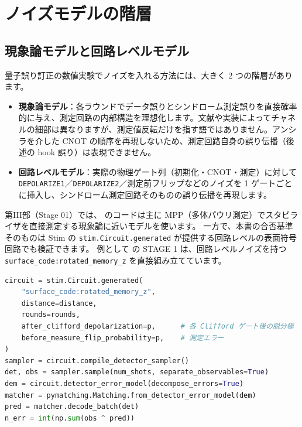 \section{ノイズモデルの階層}\label{sec:noise_models}

\subsection{現象論モデルと回路レベルモデル}

量子誤り訂正の数値実験でノイズを入れる方法には、大きく 2 つの階層があります。

\begin{itemize}
  \item \textbf{現象論モデル}：各ラウンドでデータ誤りとシンドローム測定誤りを直接確率的に与え、測定回路の内部構造を理想化します。文献や実装によってチャネルの細部は異なりますが、測定値反転だけを指す語ではありません。アンシラを介した CNOT の順序を再現しないため、測定回路自身の誤り伝播（後述の hook 誤り）は表現できません\cite{dennis2002topological}。
  \item \textbf{回路レベルモデル}：実際の物理ゲート列（初期化・CNOT・測定）に対して \texttt{DEPOLARIZE1}／\texttt{DEPOLARIZE2}／測定前フリップなどのノイズを 1 ゲートごとに挿入し、シンドローム測定回路そのものの誤り伝播を再現します。
\end{itemize}

第III部（Stage 01）では、 のコードは主に MPP（多体パウリ測定）でスタビライザを直接測定する現象論に近いモデルを使います。
一方で、本書の合否基準そのものは Stim の \texttt{stim.Circuit.generated} が提供する回路レベルの表面符号回路でも検証できます。
例として  の STAGE 1 は、回路レベルノイズを持つ \texttt{surface\_code:rotated\_memory\_z} を直接組み立てています。

\begin{lstlisting}[language=Python, caption={回路レベルノイズを持つ表面符号メモリ実験（src/stages/01\_mpp/src/ftqc/ftqc\_toy.py）}]
circuit = stim.Circuit.generated(
    "surface_code:rotated_memory_z",
    distance=distance,
    rounds=rounds,
    after_clifford_depolarization=p,      # 各 Clifford ゲート後の脱分極
    before_measure_flip_probability=p,    # 測定エラー
)
sampler = circuit.compile_detector_sampler()
det, obs = sampler.sample(num_shots, separate_observables=True)
dem = circuit.detector_error_model(decompose_errors=True)
matcher = pymatching.Matching.from_detector_error_model(dem)
pred = matcher.decode_batch(det)
n_err = int(np.sum(obs ^ pred))
\end{lstlisting}

